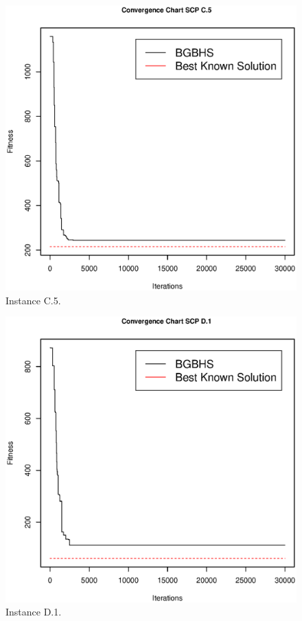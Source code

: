 \begin{figure}[]
\centering
\includegraphics[scale=.45]{Resultados/scpC5.eps}
\caption{Instance C.5.}
\label{fig:Instance.C.5}
\end{figure}

\begin{figure}[]
\centering
\includegraphics[scale=.45]{Resultados/scpD1.eps}
\caption{Instance D.1.}
\label{fig:Instance.D.1}
\end{figure}

